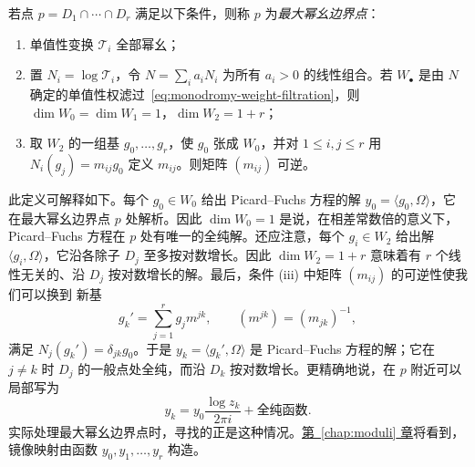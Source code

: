 \begin{definition}\label{def:maximal-unipotent-point}
 若点 $p=D_1\cap\cdots\cap D_r$ 满足以下条件，则称 $p$ 为\emph{最大幂幺边界点}：
\begin{enumerate}[label=(\roman*)]
\item 单值性变换 $\mathcal T_i$ 全部幂幺；
\item 置 $N_i=\log\mathcal T_i$，令 $N=\sum_i a_iN_i$ 为所有 $a_i>0$ 的线性组合。若 $W_\bullet$ 是由 $N$ 确定的单值性权滤过~\eqref{eq:monodromy-weight-filtration}，则 $\dim W_0=\dim W_1=1$，$\dim W_2=1+r$；
\item 取 $W_2$ 的一组基 $g_0,\ldots,g_r$，使 $g_0$ 张成 $W_0$，并对 $1\leq i,j\leq r$ 用 $N_i(g_j)=m_{ij}g_0$ 定义 $m_{ij}$。则矩阵 $(m_{ij})$ 可逆。
\end{enumerate}
\end{definition}

此定义可解释如下。每个 $g_0\in W_0$ 给出 Picard--Fuchs 方程的解 $y_0=\langle g_0,\Omega\rangle$，它在最大幂幺边界点 $p$ 处解析。因此 $\dim W_0=1$ 是说，在相差常数倍的意义下，Picard--Fuchs 方程在 $p$ 处有唯一的全纯解。还应注意，每个 $g_i\in W_2$ 给出解 $\langle g_i,\Omega\rangle$，它沿各除子 $D_j$ 至多按对数增长。因此 $\dim W_2=1+r$ 意味着有 $r$ 个线性无关的、沿 $D_j$ 按对数增长的解。最后，条件 (iii) 中矩阵 $(m_{ij})$ 的可逆性使我们可以换到
新基
\begin{equation}\label{eq:mum-logarithmic-basis}
g_k'=\sum_{j=1}^r g_jm^{jk},\qquad
(m^{jk})=(m_{jk})^{-1},
\end{equation}
满足 $N_j(g_k')=\delta_{jk}g_0$。于是 $y_k=\langle g_k',\Omega\rangle$ 是 Picard--Fuchs 方程的解；它在 $j\ne k$ 时 $D_j$ 的一般点处全纯，而沿 $D_k$ 按对数增长。更精确地说，在 $p$ 附近可以局部写为
\[
y_k=y_0\frac{\log z_k}{2\pi i}+\text{全纯函数}.
\]
实际处理最大幂幺边界点时，寻找的正是这种情况。\hyperref[chap:moduli]{第~\ref*{chap:moduli} 章}将看到，镜像映射由函数 $y_0,y_1,\ldots,y_r$ 构造。

